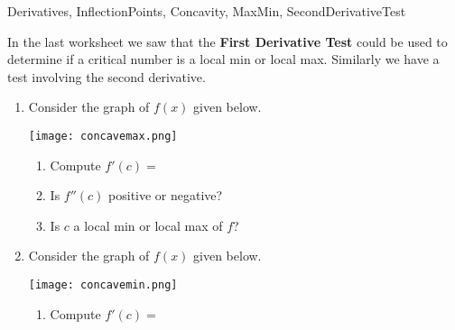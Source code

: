 
\begin{tagblock}{Derivatives, InflectionPoints, Concavity, MaxMin, SecondDerivativeTest }
\begin{question}

In the last worksheet we saw that the \textbf{First Derivative Test} could be used to determine if a critical number is a local min or local max.  Similarly we have a test involving the second derivative.

\bigskip

\begin{enumerate}
\item Consider the graph of $f(x)$ given below. 
\begin{minipage}{.4\textwidth}
\texttt{[image: concavemax.png]}\end{minipage}%
\begin{minipage}{.6\textwidth}
\begin{enumerate}
\item Compute $f '(c) = $

\vspace{.5in}

\item Is $f ''(c)$ positive or negative?  

\vspace{.5in}
\item Is $c$ a local min or local max of $f$?
\vspace{.5in}

\end{enumerate}

\end{minipage}

\item Consider the graph of $f(x)$ given below. 
\begin{minipage}{.4\textwidth}
\texttt{[image: concavemin.png]}\end{minipage}%
\begin{minipage}{.6\textwidth}
\begin{enumerate}
\item Compute $f '(c) = $

\vspace{.5in}


\end{enumerate}
\end{minipage}
\end{enumerate}
\end{question}
\end{tagblock}
